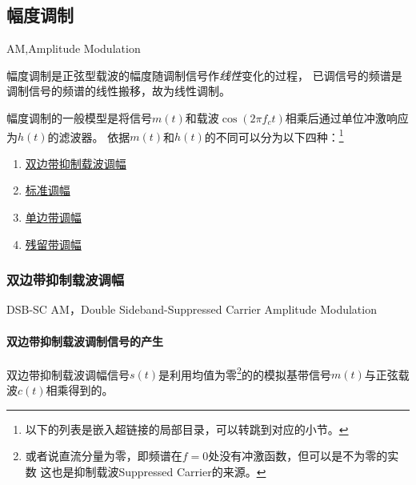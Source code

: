\subsection{幅度调制}
    AM,Amplitude Modulation

    幅度调制是正弦型载波的幅度随调制信号作\emph{线性}变化的过程，
    已调信号的频谱是调制信号的频谱的线性搬移，故为线性调制。

    幅度调制的一般模型是将信号$m(t)$和载波$\cos(2\pi f_ct)$相乘后通过单位冲激响应为$h(t)$的滤波器。
    依据$m(t)$和$h(t)$的不同可以分为以下四种：\footnote{以下的列表是嵌入超链接的局部目录，可以转跳到对应的小节。}
    \begin{enumerate}[itemsep=0pt,parsep=0em,label=\color{bupt}\arabic*、,labelsep=0pt,leftmargin=4em]
        \item \hyperref[subsubsec:DSB-SCAM]{双边带抑制载波调幅}
        \item \hyperref[subsubsec:AM]{标准调幅}
        \item \hyperref[subsubsec:SSB]{单边带调幅}
        \item \hyperref[subsubsec:VSB]{残留带调幅}
    \end{enumerate}

    \subsubsection{双边带抑制载波调幅}\label{subsubsec:DSB-SCAM}
    DSB-SC AM，Double Sideband-Suppressed Carrier Amplitude Modulation
    
    \paragraph{双边带抑制载波调制信号的产生}\mbox{}

    双边带抑制载波调幅信号$s(t)$是利用均值为零\footnote{或者说直流分量为零，即频谱在$f=0$处没有冲激函数，但可以是不为零的实数
    这也是抑制载波Suppressed Carrier的来源。}的的模拟基带信号$m(t)$与正弦载波$c(t)$相乘得到的。

